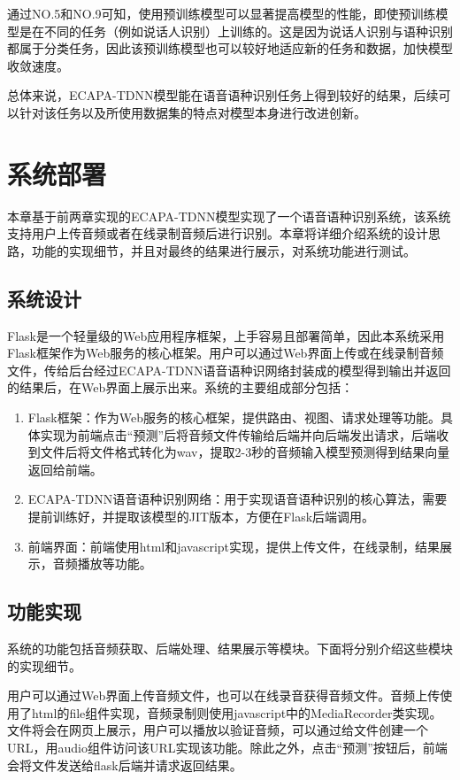 通过NO.5和NO.9可知，使用预训练模型可以显著提高模型的性能，即使预训练模型是在不同的任务（例如说话人识别）上训练的。这是因为说话人识别与语种识别都属于分类任务，因此该预训练模型也可以较好地适应新的任务和数据，加快模型收敛速度。

总体来说，ECAPA-TDNN模型能在语音语种识别任务上得到较好的结果，后续可以针对该任务以及所使用数据集的特点对模型本身进行改进创新。

\chapter{系统部署}
本章基于前两章实现的ECAPA-TDNN模型实现了一个语音语种识别系统，该系统支持用户上传音频或者在线录制音频后进行识别。本章将详细介绍系统的设计思路，功能的实现细节，并且对最终的结果进行展示，对系统功能进行测试。
\section{系统设计}
Flask是一个轻量级的Web应用程序框架，上手容易且部署简单，因此本系统采用Flask框架作为Web服务的核心框架。用户可以通过Web界面上传或在线录制音频文件，传给后台经过ECAPA-TDNN语音语种识网络封装成的模型得到输出并返回的结果后，在Web界面上展示出来。系统的主要组成部分包括：
\begin{enumerate}
  \item Flask框架：作为Web服务的核心框架，提供路由、视图、请求处理等功能。具体实现为前端点击“预测”后将音频文件传输给后端并向后端发出请求，后端收到文件后将文件格式转化为wav，提取2-3秒的音频输入模型预测得到结果向量返回给前端。
  \item ECAPA-TDNN语音语种识别网络：用于实现语音语种识别的核心算法，需要提前训练好，并提取该模型的JIT版本，方便在Flask后端调用。
  \item 前端界面：前端使用html和javascript实现，提供上传文件，在线录制，结果展示，音频播放等功能。
\end{enumerate}

\section{功能实现}
系统的功能包括音频获取、后端处理、结果展示等模块。下面将分别介绍这些模块的实现细节。

用户可以通过Web界面上传音频文件，也可以在线录音获得音频文件。音频上传使用了html的file组件实现，音频录制则使用javascript中的MediaRecorder类实现。文件将会在网页上展示，用户可以播放以验证音频，可以通过给文件创建一个URL，用audio组件访问该URL实现该功能。除此之外，点击“预测”按钮后，前端会将文件发送给flask后端并请求返回结果。

